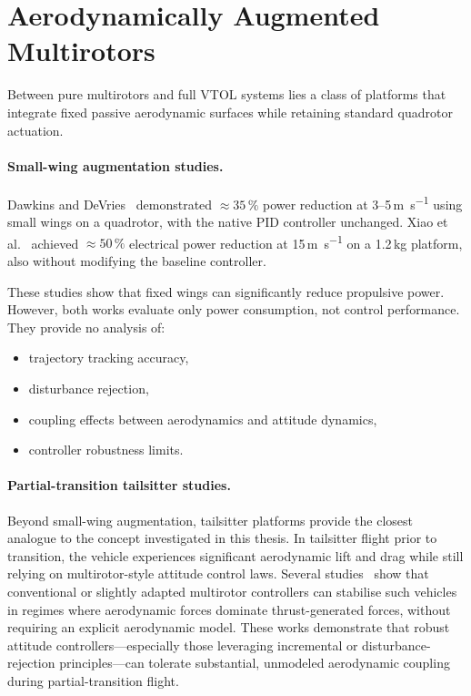 \section{Aerodynamically Augmented Multirotors}

Between pure multirotors and full VTOL systems lies a class of platforms that integrate fixed passive aerodynamic surfaces while retaining standard quadrotor actuation.

\paragraph{Small-wing augmentation studies.}
Dawkins and DeVries~\cite{Dawkins2018} demonstrated $\approx 35\,\%$ power reduction at 3--5\,\si{\meter\per\second} using small wings on a quadrotor, with the native PID controller unchanged.
Xiao et al.~\cite{Xiao2020} achieved $\approx 50\,\%$ electrical power reduction at 15\,\si{\meter\per\second} on a 1.2\,kg platform, also without modifying the baseline controller.

These studies show that fixed wings can significantly reduce propulsive power.
However, both works evaluate only power consumption, not control performance. They provide no analysis of:
\begin{itemize}
\item trajectory tracking accuracy,
\item disturbance rejection,
\item coupling effects between aerodynamics and attitude dynamics,
\item controller robustness limits.
\end{itemize}

\paragraph{Partial-transition tailsitter studies.}
Beyond small-wing augmentation, tailsitter platforms provide the closest analogue to the concept investigated in this thesis. In tailsitter flight prior to transition, the vehicle experiences significant aerodynamic lift and drag while still relying on multirotor-style attitude control laws. Several studies~\cite{Zhou2017,Oosedo2017,Tal2022Global,DaudFilho2024} show that conventional or slightly adapted multirotor controllers can stabilise such vehicles in regimes where aerodynamic forces dominate thrust-generated forces, without requiring an explicit aerodynamic model. These works demonstrate that robust attitude controllers---especially those leveraging incremental or disturbance-rejection principles---can tolerate substantial, unmodeled aerodynamic coupling during partial-transition flight. 

